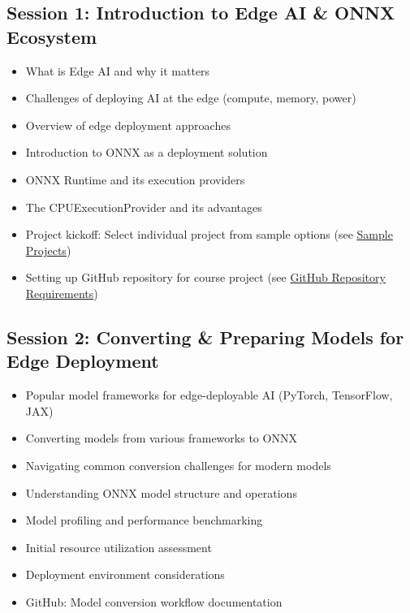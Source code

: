 \documentclass[11pt]{article}
\begin{document}
	\subsection{Session 1: Introduction to Edge AI \& ONNX Ecosystem}
	\label{subsec:week1-session1}
	\begin{itemize}
		\item What is Edge AI and why it matters
		\item Challenges of deploying AI at the edge (compute, memory, power)
		\item Overview of edge deployment approaches
		\item Introduction to ONNX as a deployment solution
		\item ONNX Runtime and its execution providers
		\item The CPUExecutionProvider and its advantages
		\item Project kickoff: Select individual project from sample options (see \hyperref[sec:sample-projects]{Sample Projects})
		\item Setting up GitHub repository for course project (see \hyperref[sec:github]{GitHub Repository Requirements})
	\end{itemize}
	
	\begin{center}
	\end{center}
	
	\subsection{Session 2: Converting \& Preparing Models for Edge Deployment}
	\label{subsec:week1-session2}
	\begin{itemize}
		\item Popular model frameworks for edge-deployable AI (PyTorch, TensorFlow, JAX)
		\item Converting models from various frameworks to ONNX
		\item Navigating common conversion challenges for modern models
		\item Understanding ONNX model structure and operations
		\item Model profiling and performance benchmarking
		\item Initial resource utilization assessment
		\item Deployment environment considerations
		\item GitHub: Model conversion workflow documentation
	\end{itemize}
	
\end{document}
